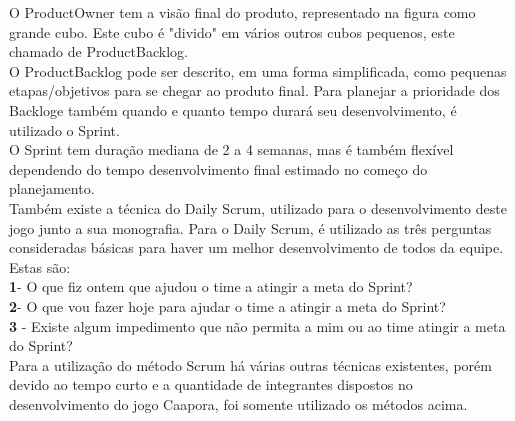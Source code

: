 	\begin{figure}[h!]
		\centering
	\end{figure}
	O ProductOwner tem a visão final do produto, representado na figura como grande cubo. Este cubo é "divido" em vários outros cubos pequenos, este chamado de ProductBacklog.\\
O ProductBacklog pode ser descrito, em uma forma simplificada, como pequenas etapas/objetivos para se chegar ao produto final.
Para planejar a prioridade dos Backloge também quando e quanto tempo durará seu desenvolvimento, é utilizado o Sprint.\\
O Sprint tem duração mediana de 2 a 4 semanas, mas é também flexível dependendo do tempo desenvolvimento final estimado no começo do planejamento.\\

Também existe a técnica do Daily Scrum, utilizado para o desenvolvimento deste jogo junto a sua monografia. Para o Daily Scrum, é utilizado as três perguntas consideradas básicas para haver um melhor desenvolvimento de todos da equipe.\\
Estas são:\\ 
\textbf{1}- O que fiz ontem que ajudou o time a atingir a meta do Sprint?\\
\textbf{2}- O que vou fazer hoje para ajudar o time a atingir a meta do Sprint?\\
\textbf{3} - Existe algum impedimento que não permita a mim ou ao time atingir a meta do Sprint?\\
Para a utilização do método Scrum há várias outras técnicas existentes, porém devido ao tempo curto e a quantidade de integrantes dispostos no desenvolvimento do jogo Caapora, foi somente utilizado os métodos acima.


